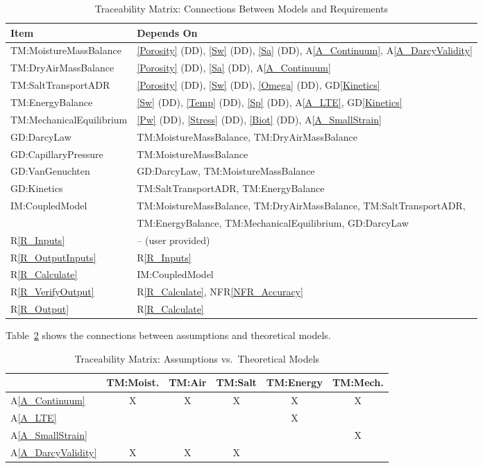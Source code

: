 \documentclass[12pt]{article}
\newcommand{\rref}[1]{R\ref{#1}}
\begin{document}
\begin{table}[H]
\caption{Traceability Matrix: Connections Between Models and Requirements}
\label{Table:trace}
\renewcommand{\arraystretch}{1.2}
\centering
\begin{tabular}{|l|l|}
\hline
\textbf{Item} & \textbf{Depends On} \\
\hline
TM:MoistureMassBalance & \ref{Porosity} (DD), \ref{Sw} (DD), \ref{Sa} (DD), A\ref{A_Continuum}, A\ref{A_DarcyValidity} \\
TM:DryAirMassBalance   & \ref{Porosity} (DD), \ref{Sa} (DD), A\ref{A_Continuum} \\
TM:SaltTransportADR    & \ref{Porosity} (DD), \ref{Sw} (DD), \ref{Omega} (DD), GD\ref{Kinetics} \\
TM:EnergyBalance       & \ref{Sw} (DD), \ref{Temp} (DD), \ref{Sp} (DD), A\ref{A_LTE}, GD\ref{Kinetics} \\
TM:MechanicalEquilibrium & \ref{Pw} (DD), \ref{Stress} (DD), \ref{Biot} (DD), A\ref{A_SmallStrain} \\
GD:DarcyLaw            & TM:MoistureMassBalance, TM:DryAirMassBalance \\
GD:CapillaryPressure   & TM:MoistureMassBalance \\
GD:VanGenuchten        & GD:DarcyLaw, TM:MoistureMassBalance \\
GD:Kinetics            & TM:SaltTransportADR, TM:EnergyBalance \\
IM:CoupledModel        & TM:MoistureMassBalance, TM:DryAirMassBalance, TM:SaltTransportADR, \\
                       & TM:EnergyBalance, TM:MechanicalEquilibrium, GD:DarcyLaw \\
\hline
\rref{R_Inputs}        & -- (user provided) \\
\rref{R_OutputInputs}  & \rref{R_Inputs} \\
\rref{R_Calculate}     & IM:CoupledModel \\
\rref{R_VerifyOutput}  & \rref{R_Calculate}, NFR\ref{NFR_Accuracy} \\
\rref{R_Output}        & \rref{R_Calculate} \\
\hline
\end{tabular}
\end{table}

Table~\ref{Table:A_trace} shows the connections between assumptions and theoretical models.

\begin{table}[H]
\caption{Traceability Matrix: Assumptions vs.\ Theoretical Models}
\label{Table:A_trace}
\renewcommand{\arraystretch}{1.2}
\centering
\begin{tabular}{|l|c|c|c|c|c|}
\hline
 & TM:Moist. & TM:Air & TM:Salt & TM:Energy & TM:Mech. \\
\hline
A\ref{A_Continuum}   & X & X & X & X & X \\
A\ref{A_LTE}         &   &   &   & X &   \\
A\ref{A_SmallStrain} &   &   &   &   & X \\
A\ref{A_DarcyValidity} & X & X & X &   &   \\
\hline
\end{tabular}
\end{table}
\end{document}
